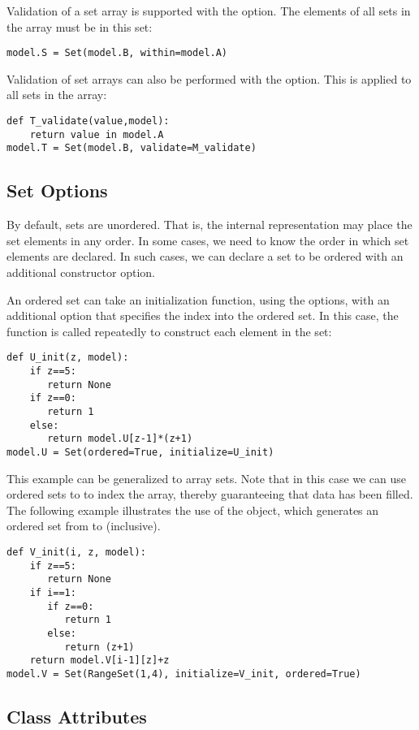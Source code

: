 Validation of a set array is supported with the  option.  The
elements of all sets in the array must be in this set:
\begin{lstlisting}
model.S = Set(model.B, within=model.A)
\end{lstlisting}
Validation of set arrays can also be performed with the  option.
This is applied to all sets in the array:
\begin{lstlisting}
def T_validate(value,model):
    return value in model.A
model.T = Set(model.B, validate=M_validate)
\end{lstlisting}


\subsection{Set Options}

By default, sets are unordered.  That is, the internal representation
may place the set elements in any order.  In some cases, we need to know
the order in which set elements are declared.  In such cases, we can declare
a set to be ordered with an additional constructor option.  

An ordered set can take an 
initialization function, using the  options, with an additional option 
that specifies the index into the ordered set.  In this case, the function is 
called repeatedly to construct each element in the set:
\begin{lstlisting}
def U_init(z, model):
    if z==5:
       return None
    if z==0:
       return 1
    else:
       return model.U[z-1]*(z+1)
model.U = Set(ordered=True, initialize=U_init)
\end{lstlisting}
This example can be generalized to array sets.  Note that in this case
we can use ordered sets to to index the array, thereby guaranteeing that
data has been filled.  The following example illustrates the use of the
 object, which generates an ordered set from  to 
(inclusive).
\begin{lstlisting}
def V_init(i, z, model):
    if z==5:
       return None
    if i==1:
       if z==0:
          return 1
       else:
          return (z+1)
    return model.V[i-1][z]+z
model.V = Set(RangeSet(1,4), initialize=V_init, ordered=True)
\end{lstlisting}


\subsection{Class Attributes}


